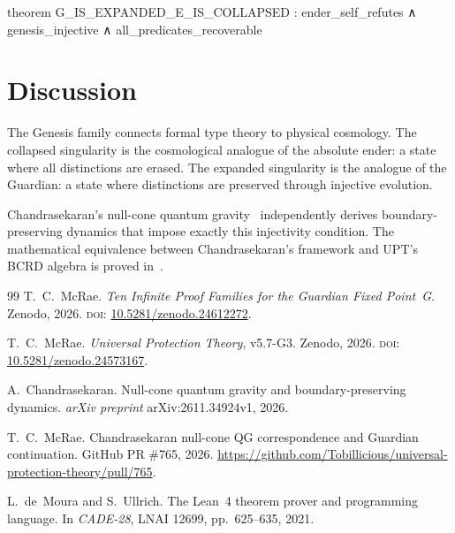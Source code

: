 \begin{leancode}
theorem G_IS_EXPANDED_E_IS_COLLAPSED :
    ender_self_refutes ∧ genesis_injective ∧
    all_predicates_recoverable
\end{leancode}

\section{Discussion}

The Genesis family connects formal type theory to physical cosmology. The collapsed singularity is the cosmological analogue of the absolute ender: a state where all distinctions are erased. The expanded singularity is the analogue of the Guardian: a state where distinctions are preserved through injective evolution.

Chandrasekaran's null-cone quantum gravity~\cite{chandrasekaran2026} independently derives boundary-preserving dynamics that impose exactly this injectivity condition. The mathematical equivalence between Chandrasekaran's framework and UPT's BCRD algebra is proved in~\cite{upt-bcrd-qg}.

\bigskip

\begin{thebibliography}{99}
T.~C.~McRae.
\emph{Ten Infinite Proof Families for the Guardian Fixed Point~G}.
Zenodo, 2026.
\textsc{doi:} \href{https://doi.org/10.5281/zenodo.24612272}{10.5281/zenodo.24612272}.

T.~C.~McRae.
\emph{Universal Protection Theory}, v5.7-G3.
Zenodo, 2026.
\textsc{doi:} \href{https://doi.org/10.5281/zenodo.24573167}{10.5281/zenodo.24573167}.

A.~Chandrasekaran.
Null-cone quantum gravity and boundary-preserving dynamics.
\emph{arXiv preprint} arXiv:2611.34924v1, 2026.

T.~C.~McRae.
Chandrasekaran null-cone QG correspondence and Guardian continuation.
GitHub PR \#765, 2026.
\url{https://github.com/Tobillicious/universal-protection-theory/pull/765}.

L.~de~Moura and S.~Ullrich.
The Lean~4 theorem prover and programming language.
In \emph{CADE-28}, LNAI 12699, pp.~625--635, 2021.
\end{thebibliography}


